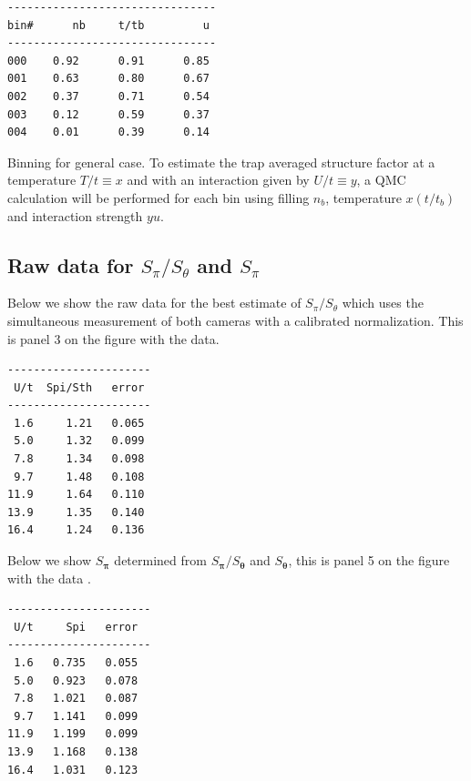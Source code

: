 \documentclass[11pt,letter]{article}
\newcommand{\bv}[1]{\ensuremath{\bm{#1}}}
\begin{document}
\begin{table}
\centering
\begin{minipage}[b][10em][b]{0.36\textwidth}
\begin{verbatim}
--------------------------------
bin#      nb     t/tb         u
--------------------------------
000    0.92      0.91      0.85
001    0.63      0.80      0.67
002    0.37      0.71      0.54
003    0.12      0.59      0.37
004    0.01      0.39      0.14
\end{verbatim}
\end{minipage}
\caption[Binning for general case]{Binning for general case.   To estimate the
trap averaged structure factor at a temperature $T/t\equiv x$ and with an
interaction given by $U/t\equiv y$,  a QMC calculation will be performed for
each bin using filling $n_{b}$, temperature $x(t/t_{b})$ and interaction
strength $yu$.  }
\label{table:binavg} 
\end{table}


\subsection{Raw data for $S_{\pi}/S_{\theta}$ and $S_{\pi}$ }

Below we show the raw data for the best estimate of $S_{\pi}/S_{\theta}$ which uses the simultaneous measurement of both cameras with a calibrated normalization.  This is panel 3 on the figure with the data. 

\begin{verbatim}
----------------------
 U/t  Spi/Sth   error
----------------------
 1.6     1.21   0.065
 5.0     1.32   0.099
 7.8     1.34   0.098
 9.7     1.48   0.108
11.9     1.64   0.110
13.9     1.35   0.140
16.4     1.24   0.136
\end{verbatim}

\vspace{2em}

Below we show $S_{\bv{\pi}}$ determined from $S_{\bv{\pi}}/S_{\bv{\theta}}$ and $S_{\bv{\theta}}$, this is panel 5 on the figure with the data .

\begin{verbatim}
----------------------
 U/t     Spi   error
----------------------
 1.6   0.735   0.055
 5.0   0.923   0.078
 7.8   1.021   0.087
 9.7   1.141   0.099
11.9   1.199   0.099
13.9   1.168   0.138
16.4   1.031   0.123
\end{verbatim}

\vspace{2em}
\newpage
\end{document}
